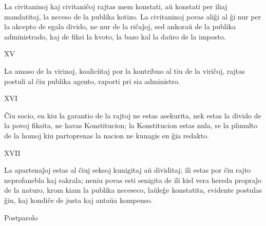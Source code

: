 \documentclass{book}
\begin{document}
La civitaninoj kaj civitaniĉoj rajtas mem konstati, aŭ konstati per iliaj mandatitoj, la neceso de la publika kotizo. La civitaninoj povas aliĝi al ĝi nur per la akcepto de egala divido, ne nur de la riĉaĵoj, sed ankoraŭ de la publika administrado, kaj de fiksi la kvoto, la bazo kal la daŭro de la imposto.

\vspace{1em}
\indent\indent\indent\indent XV
\vspace{0.5em}

La amaso de la virinoj, koaliciitaj por la kontribuo al tiu de la viriĉoj, rajtas postuli al ĉiu publika agento, raporti pri sia administro.

\vspace{1em}
\indent\indent\indent\indent XVI
\vspace{0.5em}

Ĉiu socio, en kiu la garantio de la rajtoj ne estas asekurita, nek estas la divido de la povoj fiksita, ne havas Konstitucion; la Konstitucion estas nula, se la plimulto de la homoj kiu partoprenas la nacion ne kunagis en ĝia redakto.

\vspace{1em}
\indent\indent\indent\indent XVII
\vspace{0.5em}

La apartenaĵoj estas al ĉiuj seksoj kunigitaj aŭ dividitaj; ili estas por ĉiu rajto neprofanebla kaj sakrala; neniu povas esti senigita de ili kiel vera hereda propraĵo de la naturo, krom kiam la publika neceseco, laŭleĝe konstatita, evidente postulas ĝin, kaj kondiĉe de justa kaj antaŭa kompenso.

\vspace{1em}
\indent\indent\indent\indent Postparolo
\vspace{0.5em}
\end{document}
